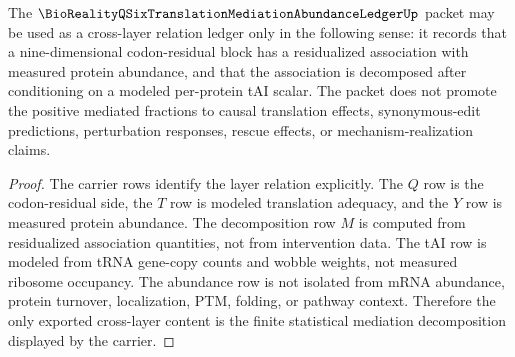 \begin{theorem}
\label{thm:bioreality-q-six-translation-mediation-boundary}
The $\BioRealityQSixTranslationMediationAbundanceLedgerUp$ packet may be used as a cross-layer relation ledger only in the following sense: it records that a nine-dimensional codon-residual block has a residualized association with measured protein abundance, and that the association is decomposed after conditioning on a modeled per-protein tAI scalar. The packet does not promote the positive mediated fractions to causal translation effects, synonymous-edit predictions, perturbation responses, rescue effects, or mechanism-realization claims.
\end{theorem}

\begin{proof}
The carrier rows identify the layer relation explicitly. The $Q$ row is the codon-residual side, the $T$ row is modeled translation adequacy, and the $Y$ row is measured protein abundance. The decomposition row $M$ is computed from residualized association quantities, not from intervention data. The tAI row is modeled from tRNA gene-copy counts and wobble weights, not measured ribosome occupancy. The abundance row is not isolated from mRNA abundance, protein turnover, localization, PTM, folding, or pathway context. Therefore the only exported cross-layer content is the finite statistical mediation decomposition displayed by the carrier.
\end{proof}




